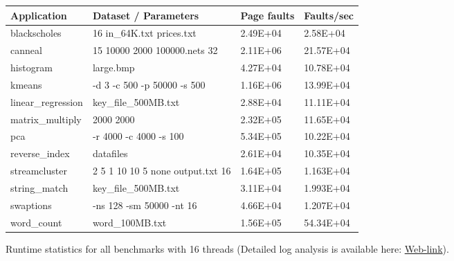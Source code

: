 \begin{figure}[t]
\centering
\myfontsize
{
\begin{tabular}{m{1.6cm}|m{3.2cm}| m{1.2cm}|m{1.3cm}}
   { Application} & Dataset / Parameters & Page faults & Faults/sec\\
  \hline \hline
    blackscholes& 16 in\_64K.txt prices.txt & 2.49E+04& 2.58E+04 \\
    canneal& 15 10000 2000 100000.nets 32 & 2.11E+06 & 21.57E+04 \\
    histogram& large.bmp & 4.27E+04 & 10.78E+04	  \\
    kmeans& -d 3 -c 500 -p 50000 -s 500 & 1.16E+06 & 13.99E+04  \\
    linear\_regression& key\_file\_500MB.txt & 2.88E+04 & 11.11E+04  \\
    matrix\_multiply& 2000 2000 & 2.32E+05 & 11.65E+04  \\
    pca& -r 4000 -c 4000 -s 100 & 5.34E+05 & 10.22E+04\\
    reverse\_index & datafiles & 2.61E+04 & 10.35E+04  \\
    streamcluster& 2 5 1 10 10 5 none output.txt 16 & 1.64E+05 & 1.163E+04\\
    string\_match &key\_file\_500MB.txt & 3.11E+04 & 1.993E+04\\
    swaptions & -ns 128 -sm 50000 -nt 16  & 4.66E+04 & 1.207E+04 \\
    word\_count& word\_100MB.txt	 & 1.56E+05 & 54.34E+04  \\

\hline
\end{tabular}
}


\caption{\label{tab:apps} Runtime statistics for all benchmarks with 16 threads (Detailed log analysis is available here: \href{https://mic92.github.io/inspector/index.html\#measurement_table}{Web-link}). }                                                                                                                                  


\end{figure}
